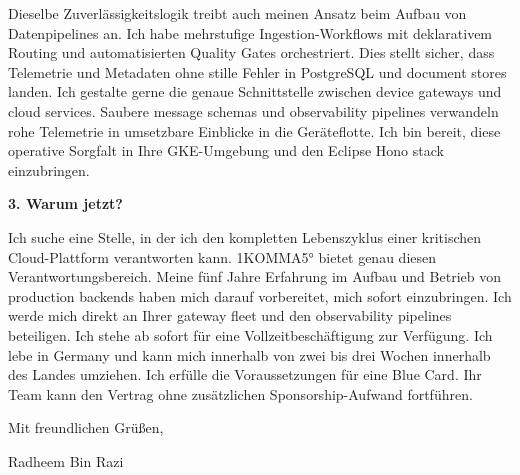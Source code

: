 \documentclass[11pt,a4paper]{coverletter}
\begin{document}
Dieselbe Zuverlässigkeitslogik treibt auch meinen Ansatz beim Aufbau von Datenpipelines an. Ich habe mehrstufige Ingestion-Workflows mit deklarativem Routing und automatisierten Quality Gates orchestriert. Dies stellt sicher, dass Telemetrie und Metadaten ohne stille Fehler in PostgreSQL und document stores landen. Ich gestalte gerne die genaue Schnittstelle zwischen device gateways und cloud services. Saubere message schemas und observability pipelines verwandeln rohe Telemetrie in umsetzbare Einblicke in die Geräteflotte. Ich bin bereit, diese operative Sorgfalt in Ihre GKE-Umgebung und den Eclipse Hono stack einzubringen.

\vspace{8pt}\noindent\textbf{3. Warum jetzt?}\par\vspace{3pt}

Ich suche eine Stelle, in der ich den kompletten Lebenszyklus einer kritischen Cloud-Plattform verantworten kann. 1KOMMA5° bietet genau diesen Verantwortungsbereich. Meine fünf Jahre Erfahrung im Aufbau und Betrieb von production backends haben mich darauf vorbereitet, mich sofort einzubringen. Ich werde mich direkt an Ihrer gateway fleet und den observability pipelines beteiligen. Ich stehe ab sofort für eine Vollzeitbeschäftigung zur Verfügung. Ich lebe in Germany und kann mich innerhalb von zwei bis drei Wochen innerhalb des Landes umziehen. Ich erfülle die Voraussetzungen für eine Blue Card. Ihr Team kann den Vertrag ohne zusätzlichen Sponsorship-Aufwand fortführen.

\closing{Mit freundlichen Grüßen,}{Radheem Bin Razi}
\end{document}
